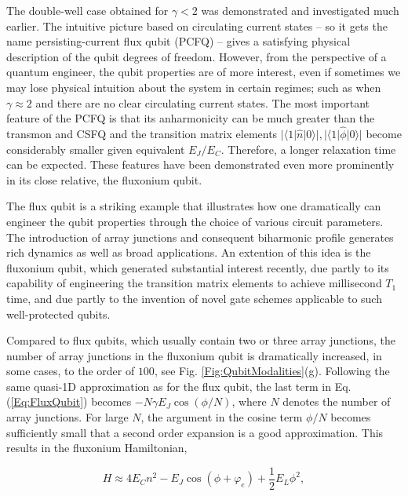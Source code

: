 \documentclass[aip,apr,twocolumn,showpacs,superscriptaddress,groupedaddress,nofootinbib,reprint]{revtex4-1}  %
\begin{document}
The double-well case obtained for $\gamma < 2$ was demonstrated and investigated much earlier\cite{Orlando1999,Mooij1999}. The intuitive picture based on circulating current states -- so it gets the name persisting-current flux qubit (PCFQ) -- gives a satisfying physical description of the qubit degrees of freedom. However, from the perspective of a quantum engineer, the qubit properties are of more interest, even if sometimes we may lose physical intuition about the system in certain regimes; such as when $\gamma \approx 2$ and there are no clear circulating current states. The most important feature of the PCFQ is that its anharmonicity can be much greater than the transmon and CSFQ and the transition matrix elements $|\langle 1|\hat{n}|0\rangle|, |\langle 1|\hat{\phi}|0\rangle|$ become considerably smaller given equivalent $E_J / E_C$. Therefore, a longer relaxation time can be expected. These features have been demonstrated even more prominently in its close relative, the fluxonium qubit\cite{Pop2014}.

The flux qubit is a striking example that illustrates how one dramatically can engineer the qubit properties through the choice of various circuit parameters. The introduction of array junctions and consequent biharmonic profile generates rich dynamics as well as broad applications. An extention of this idea is the fluxonium qubit, which generated substantial interest recently, due partly to its capability of engineering the transition matrix elements to achieve millisecond $T_1$ time, and due partly to the invention of novel gate schemes applicable to such well-protected qubits\cite{Earnest2018,Lin2018}.

Compared to flux qubits, which usually contain two or three array junctions\cite{Bylander2011}, the number of array junctions in the fluxonium qubit is dramatically increased\cite{Manucharyan2009,Pop2014}, in some cases, to the order of $100$, see Fig. \ref{Fig:QubitModalities}(g). Following the same quasi-1D approximation as for the flux qubit, the last term in Eq. (\ref{Eq:FluxQubit}) becomes $-N\gamma E_J \cos (\phi/N)$, where $N$ denotes the number of array junctions. For large $N$, the argument in the cosine term $\phi/N$ becomes sufficiently small that a second order expansion is a good approximation. This results in the fluxonium Hamiltonian,


\begin{equation}
H \approx 4E_Cn^2 - E_{J}\cos(\phi + \varphi_e) + \frac{1}{2}E_L \phi^2,
\label{Eq:Fluxonium}
\end{equation}
\end{document}
